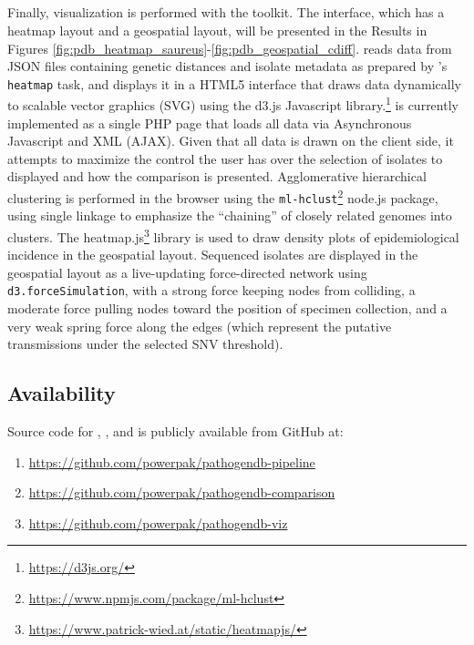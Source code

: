 \subsection{\pathogendbviz}

Finally, visualization is performed with the \pathogendbviz{} toolkit. The interface, which has a heatmap layout and a geospatial layout, will be presented in the Results in Figures \ref{fig:pdb_heatmap_saureus}-\ref{fig:pdb_geospatial_cdiff}. \pathogendbviz{} reads data from JSON files containing genetic distances and isolate metadata as prepared by \pathogendbcomparison{}'s \verb|heatmap| task, and displays it in a HTML5 interface that draws data dynamically to scalable vector graphics (SVG) using the d3.js Javascript library.\footnote{\url{https://d3js.org/}} \pathogendbviz{} is currently implemented as a single PHP page that loads all data via Asynchronous Javascript and XML (AJAX).\autocite{Paulson2005} Given that all data is drawn on the client side, it attempts to maximize the control the user has over the selection of isolates to displayed and how the comparison is presented. Agglomerative hierarchical clustering is performed in the browser using the \texttt{ml-hclust}\footnote{\url{https://www.npmjs.com/package/ml-hclust}} node.js package, using single linkage to emphasize the ``chaining'' of closely related genomes into clusters. The heatmap.js\footnote{\url{https://www.patrick-wied.at/static/heatmapjs/}} library is used to draw density plots of epidemiological incidence in the geospatial layout. Sequenced isolates are displayed in the geospatial layout as a live-updating force-directed network using \texttt{d3.forceSimulation}, with a strong force keeping nodes from colliding, a moderate force pulling nodes toward the position of specimen collection, and a very weak spring force along the edges (which represent the putative transmissions under the selected SNV threshold).

\subsection{Availability}

Source code for \pathogendbpipeline, \pathogendbcomparison, and \pathogendbviz{} is publicly available from GitHub at:

\begin{enumerate}[label=\arabic*.,noitemsep,labelindent=2em,leftmargin=!]
\item \url{https://github.com/powerpak/pathogendb-pipeline}
\item \url{https://github.com/powerpak/pathogendb-comparison}
\item \url{https://github.com/powerpak/pathogendb-viz}
\end{enumerate}

